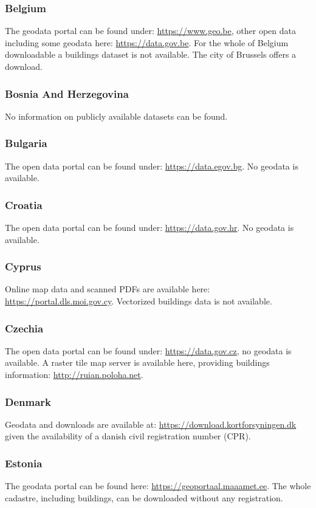 \documentclass[final, 3p, times, 12pt]{elsarticle} %
\begin{document}
\subsubsection{Belgium}
The geodata portal can be found under: \url{https://www.geo.be}, other open data including some geodata here: \url{https://data.gov.be}. For the whole of Belgium downloadable a buildings dataset is not available. The city of Brussels offers a download.
\subsubsection{Bosnia And Herzegovina}
No information on publicly available datasets can be found.
\subsubsection{Bulgaria}
The open data portal can be found under: \url{https://data.egov.bg}. No geodata is available.
\subsubsection{Croatia}
The open data portal can be found under: \url{https://data.gov.hr}. No geodata is available.
\subsubsection{Cyprus}
Online map data and scanned PDFs are available here: \url{https://portal.dls.moi.gov.cy}. Vectorized buildings data is not available.
\subsubsection{Czechia}
The open data portal can be found under: \url{https://data.gov.cz}, no geodata is available. A raster tile map server is available here, providing buildings information: \url{http://ruian.poloha.net}.
\subsubsection{Denmark}
Geodata and downloads are available at: \url{https://download.kortforsyningen.dk} given the availability of a danish civil registration number (CPR).
\subsubsection{Estonia}
The geodata portal can be found here: \url{https://geoportaal.maaamet.ee}. The whole cadastre, including buildings, can be downloaded without any registration.
\end{document}

